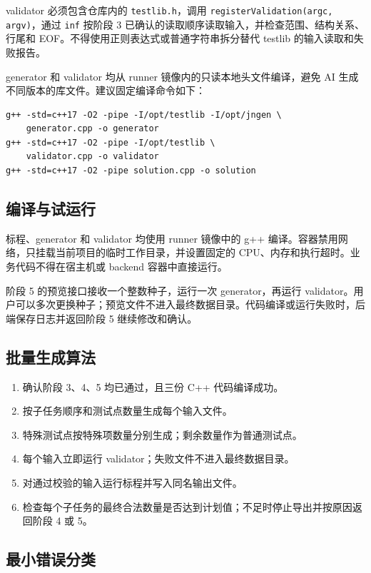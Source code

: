 \documentclass[UTF8,zihao=-4]{ctexart}
\begin{document}
validator 必须包含仓库内的 \texttt{testlib.h}，调用 \texttt{registerValidation(argc, argv)}，通过 \texttt{inf} 按阶段 3 已确认的读取顺序读取输入，并检查范围、结构关系、行尾和 EOF。不得使用正则表达式或普通字符串拆分替代 testlib 的输入读取和失败报告。

generator 和 validator 均从 runner 镜像内的只读本地头文件编译，避免 AI 生成不同版本的库文件。建议固定编译命令如下：

\begin{lstlisting}
g++ -std=c++17 -O2 -pipe -I/opt/testlib -I/opt/jngen \
    generator.cpp -o generator
g++ -std=c++17 -O2 -pipe -I/opt/testlib \
    validator.cpp -o validator
g++ -std=c++17 -O2 -pipe solution.cpp -o solution
\end{lstlisting}

\subsection{编译与试运行}

标程、generator 和 validator 均使用 runner 镜像中的 g++ 编译。容器禁用网络，只挂载当前项目的临时工作目录，并设置固定的 CPU、内存和执行超时。业务代码不得在宿主机或 backend 容器中直接运行。

阶段 5 的预览接口接收一个整数种子，运行一次 generator，再运行 validator。用户可以多次更换种子；预览文件不进入最终数据目录。代码编译或运行失败时，后端保存日志并返回阶段 5 继续修改和确认。

\subsection{批量生成算法}

\begin{enumerate}
  \item 确认阶段 3、4、5 均已通过，且三份 C++ 代码编译成功。
  \item 按子任务顺序和测试点数量生成每个输入文件。
  \item 特殊测试点按特殊项数量分别生成；剩余数量作为普通测试点。
  \item 每个输入立即运行 validator；失败文件不进入最终数据目录。
  \item 对通过校验的输入运行标程并写入同名输出文件。
  \item 检查每个子任务的最终合法数量是否达到计划值；不足时停止导出并按原因返回阶段 4 或 5。
\end{enumerate}

\subsection{最小错误分类}
\end{document}
